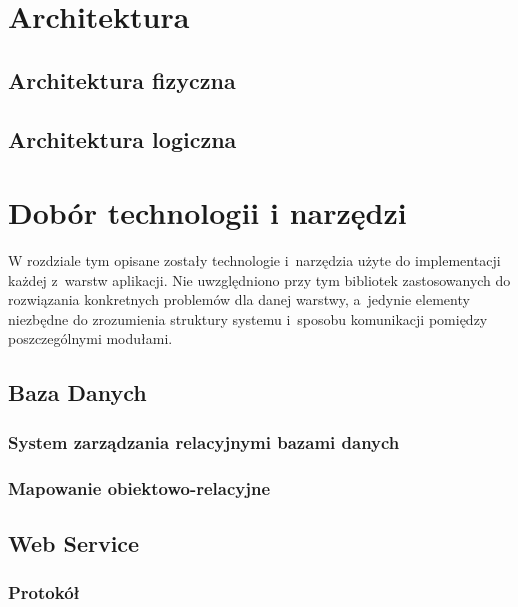 \documentclass[11pt]{aghdpl}
\begin{document}

\chapter{Architektura}
\label{cha:architektura}

\section{Architektura fizyczna}
\label{sec:architektura_fizyczna}

\section{Architektura logiczna}
\label{sec:architektura_logiczna}


\chapter{Dobór technologii i narzędzi}
\label{cha:dobor_technologii_i_narzedzi}

W rozdziale tym opisane zostały technologie i~narzędzia użyte do implementacji każdej z~warstw aplikacji. Nie uwzględniono przy tym bibliotek zastosowanych do rozwiązania konkretnych problemów dla danej warstwy, a~jedynie elementy niezbędne do zrozumienia struktury systemu i~sposobu komunikacji pomiędzy poszczególnymi modułami.


\section{Baza Danych}
\subsection{System zarządzania relacyjnymi bazami danych}
\subsection{Mapowanie obiektowo-relacyjne}
\section{Web Service}
\subsection{Protokół}
\end{document}
